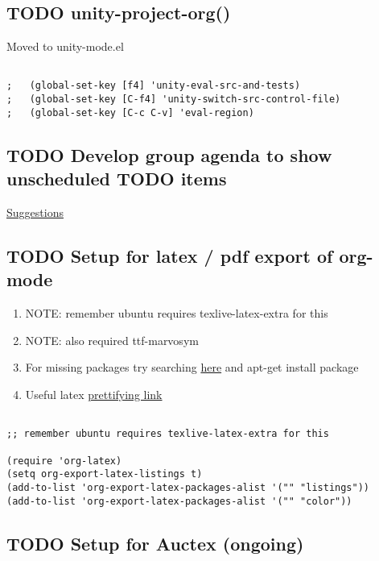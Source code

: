 \documentclass[colorlinks=true,urlcolor=blue,listings-sv]{article}
\begin{document}
\subsection{\textbf{TODO} unity-project-org()}
\label{sec-2-25}

Moved to unity-mode.el


\lstset{language=Lisp}
\begin{lstlisting}

;   (global-set-key [f4] 'unity-eval-src-and-tests)
;   (global-set-key [C-f4] 'unity-switch-src-control-file)
;   (global-set-key [C-c C-v] 'eval-region)
\end{lstlisting}
\subsection{\textbf{TODO} Develop group agenda to show unscheduled TODO items}
\label{sec-2-26}


\href{http://osdir.com/ml/emacs-orgmode-gnu/2010-03/msg00736.html}{Suggestions}
\subsection{\textbf{TODO} Setup for latex / pdf export of org-mode}
\label{sec-2-27}


\begin{enumerate}
\item NOTE: remember ubuntu requires texlive-latex-extra for this
\item NOTE: also required ttf-marvosym
\item For missing packages try searching \href{http://packages.ubuntu.com/search?keywords%3Dmarvosym&searchon%3Dnames&suite%3Dmaverick&section%3Dall}{here} and apt-get install package
\item Useful latex \href{http://had.fmf.uni-lj.si/~horvat/publishing/latex/general/latex2pdf.pdf}{prettifying link}
\end{enumerate}


\lstset{language=Lisp}
\begin{lstlisting}

;; remember ubuntu requires texlive-latex-extra for this

(require 'org-latex)
(setq org-export-latex-listings t)
(add-to-list 'org-export-latex-packages-alist '("" "listings"))
(add-to-list 'org-export-latex-packages-alist '("" "color"))
\end{lstlisting}
\subsection{\textbf{TODO} Setup for Auctex (ongoing)}
\label{sec-2-28}
\end{document}
